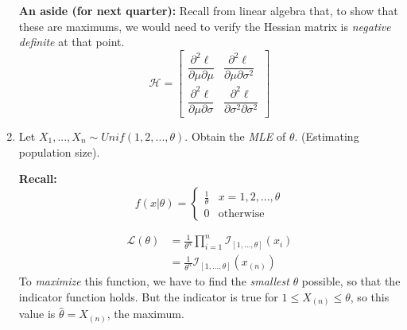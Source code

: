 \documentclass{article}
\begin{document}
\begin{enumerate}
    \textbf{An aside (for next quarter):} Recall from linear algebra that, to show that these are maximums, we would need to verify the Hessian matrix is \textit{negative definite} at that point.
    \begin{equation*}
       \mathcal{H} = \begin{bmatrix}
            \dfrac{\partial^2 \ell}{\partial \mu \partial \mu} & \dfrac{\partial^2\ell}{\partial \mu \partial \sigma^2}\\[2ex]
            \dfrac{\partial^2\ell}{\partial \mu \partial\sigma} & \dfrac{\partial^2 \ell}{\partial \sigma^2 \partial \sigma^2}
        \end{bmatrix}
    \end{equation*}
    
    \item Let $X_1,...,X_n \sim Unif(1,2,...,\theta)$. Obtain the \textit{MLE} of $\theta$. (Estimating population size).
    
    \textbf{Recall:}
    \begin{equation*}
        f(x|\theta) = \begin{cases}
            \frac{1}{\theta} & x=1,2,...,\theta\\
            0 & \text{otherwise}
        \end{cases}
    \end{equation*}
    
    \begin{equation*}
        \begin{split}
            \mathcal{L}(\theta) &= \frac{1}{\theta^n} \prod_{i=1}^n \mathcal{I}_{[1,...,\theta]}(x_i)\\
            &= \frac{1}{\theta^n} \mathcal{I}_{[1,...,\theta]}\left(x_{(n)}\right)
        \end{split}
    \end{equation*}
    To \textit{maximize} this function, we have to find the \textit{smallest} $\theta$ possible, so that the indicator function holds. But the indicator is true for $1 \leq X_{(n)} \leq \theta$, so this value is $\hat{\theta} = X_{(n)}$, the maximum.
    

\end{enumerate}
\end{document}
